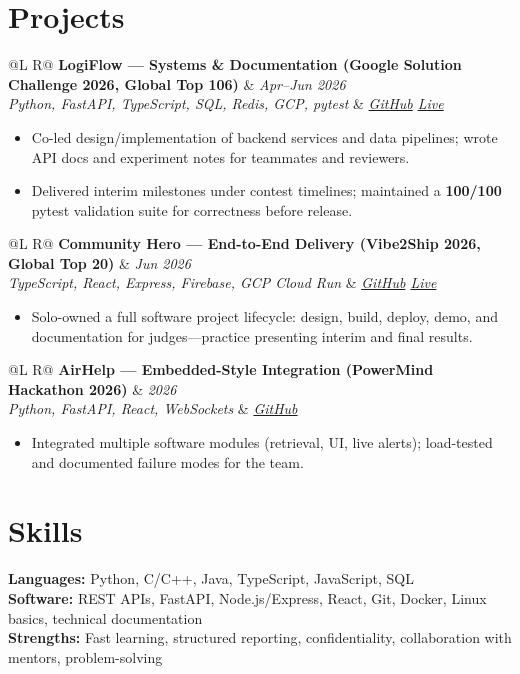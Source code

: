 \documentclass[a4paper,10pt]{article}
\makeatletter
\newcommand{\proj}[4]{%
  \vspace{1.5mm}
  \noindent\begin{tabularx}{\textwidth}{@{}L R@{}}
    \textbf{#1} & \textit{\small #2} \\
    \textit{\small #3} & \textit{\small #4} \\
  \end{tabularx}\par
  \vspace{0.5mm}%
}
\makeatother
\begin{document}
\section{Projects}
\proj{LogiFlow --- Systems \& Documentation (Google Solution Challenge 2026, Global Top 106)}{Apr--Jun 2026}
{Python, FastAPI, TypeScript, SQL, Redis, GCP, pytest}
{\href{https://github.com/Ojas-Srivastava05/LogiFlow-Solution-Challenge-2026}{GitHub} \textbar{} \href{https://logi-flow-solution-challenge-2026.vercel.app}{Live}}
\begin{itemize}
  \item Co-led design/implementation of backend services and data pipelines; wrote API docs and experiment notes for teammates and reviewers.
  \item Delivered interim milestones under contest timelines; maintained a \textbf{100/100} pytest validation suite for correctness before release.
\end{itemize}

\proj{Community Hero --- End-to-End Delivery (Vibe2Ship 2026, Global Top 20)}{Jun 2026}
{TypeScript, React, Express, Firebase, GCP Cloud Run}
{\href{https://github.com/Ojas-Srivastava05/community-hero}{GitHub} \textbar{} \href{https://community-hero-987477089222.asia-south1.run.app}{Live}}
\begin{itemize}
  \item Solo-owned a full software project lifecycle: design, build, deploy, demo, and documentation for judges---practice presenting interim and final results.
\end{itemize}

\proj{AirHelp --- Embedded-Style Integration (PowerMind Hackathon 2026)}{2026}
{Python, FastAPI, React, WebSockets}
{\href{https://github.com/Ojas-Srivastava05/AirHelp-AI-Airport-Assistant}{GitHub}}
\begin{itemize}
  \item Integrated multiple software modules (retrieval, UI, live alerts); load-tested and documented failure modes for the team.
\end{itemize}

\section{Skills}
\noindent\small
\textbf{Languages:} Python, C/C++, Java, TypeScript, JavaScript, SQL \\[0.6mm]
\textbf{Software:} REST APIs, FastAPI, Node.js/Express, React, Git, Docker, Linux basics, technical documentation \\[0.6mm]
\textbf{Strengths:} Fast learning, structured reporting, confidentiality, collaboration with mentors, problem-solving
\end{document}
